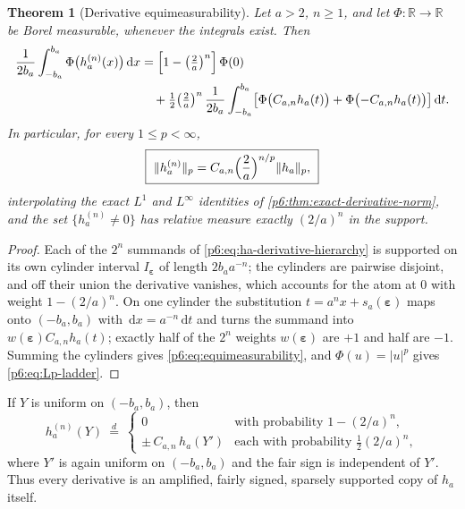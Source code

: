 \documentclass[11pt,oneside]{article}
\numberwithin{equation}{section}
\newtheorem{theorem}{Theorem}[section]
\theoremstyle{definition}
\theoremstyle{remark}
\newcommand{\R}{\mathbb R}
\newcommand{\dd}{\,\mathrm d}
\begin{document}
\begin{theorem}[Derivative equimeasurability]\label{p6:thm:equimeasurability}
Let $a>2$, $n\ge1$, and let $\Phi:\R\to\R$ be Borel measurable, whenever the
integrals exist.  Then
\begin{align}
 \frac1{2b_a}\int_{-b_a}^{b_a}\Phi\bigl(h_a^{(n)}(x)\bigr)\dd x
 &=\Bigl[1-\bigl(\tfrac2a\bigr)^{n}\Bigr]\,\Phi(0)
 \notag\\
 &\quad+\tfrac12\bigl(\tfrac2a\bigr)^{n}\,
  \frac1{2b_a}\int_{-b_a}^{b_a}
   \bigl[\Phi\bigl(C_{a,n}h_a(t)\bigr)
   +\Phi\bigl(-C_{a,n}h_a(t)\bigr)\bigr]\dd t.
 \label{p6:eq:equimeasurability}
\end{align}
In particular, for every $1\le p<\infty$,
\begin{equation}\label{p6:eq:Lp-ladder}
 \boxed{\ \|h_a^{(n)}\|_p
 =C_{a,n}\Bigl(\frac2a\Bigr)^{n/p}\|h_a\|_p,\ }
\end{equation}
interpolating the exact $L^1$ and $L^\infty$ identities of
\cref{p6:thm:exact-derivative-norm}, and the set $\{h_a^{(n)}\ne0\}$ has
relative measure exactly $(2/a)^n$ in the support.
\end{theorem}

\begin{proof}
Each of the $2^n$ summands of \eqref{p6:eq:ha-derivative-hierarchy} is supported
on its own cylinder interval $I_{\boldsymbol\varepsilon}$ of length
$2b_aa^{-n}$; the cylinders are pairwise disjoint, and off their union the
derivative vanishes, which accounts for the atom at $0$ with weight
$1-(2/a)^n$.  On one cylinder the substitution
$t=a^nx+s_a(\boldsymbol\varepsilon)$ maps onto $(-b_a,b_a)$ with
$\dd x=a^{-n}\dd t$ and turns the summand into
$w(\boldsymbol\varepsilon)C_{a,n}h_a(t)$; exactly half of the $2^n$ weights
$w(\boldsymbol\varepsilon)$ are $+1$ and half are $-1$.  Summing the cylinders
gives \eqref{p6:eq:equimeasurability}, and $\Phi(u)=|u|^p$ gives
\eqref{p6:eq:Lp-ladder}.
\end{proof}

\begin{corollary}\label{p6:cor:derivative-mixture}
If $Y$ is uniform on $(-b_a,b_a)$, then
\[
 h_a^{(n)}(Y)\ \overset d=\
 \begin{cases}
  0 & \text{with probability }1-(2/a)^n,\\
  \pm\,C_{a,n}\,h_a(Y') & \text{each with probability }\tfrac12(2/a)^n,
 \end{cases}
\]
where $Y'$ is again uniform on $(-b_a,b_a)$ and the fair sign is independent
of $Y'$.  Thus every derivative is an amplified, fairly signed, sparsely
supported copy of $h_a$ itself.
\end{corollary}
\end{document}
